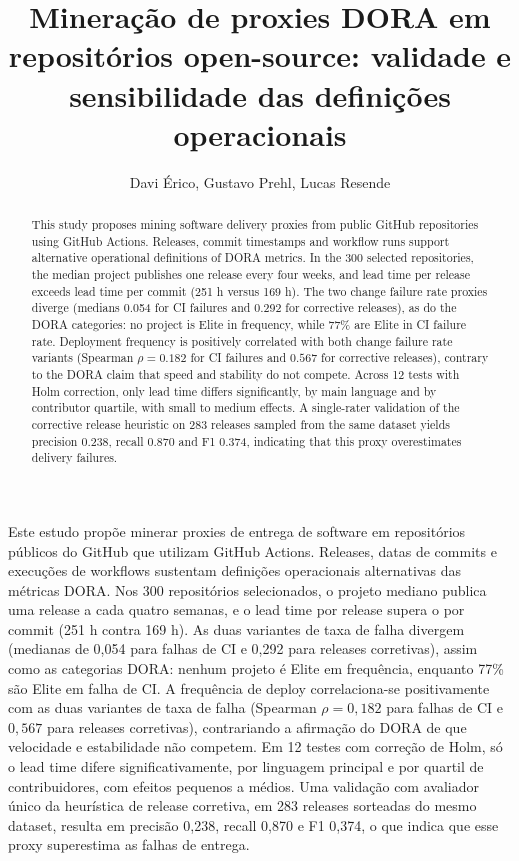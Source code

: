 \documentclass[12pt]{article}
\title{Mineração de proxies DORA em repositórios open-source:
validade e sensibilidade das definições operacionais}
\author{Davi Érico\inst{1}, Gustavo Prehl\inst{1}, Lucas Resende\inst{1}}
\begin{document}
\maketitle

\begin{abstract}
This study proposes mining software delivery proxies from public GitHub
repositories using GitHub Actions. Releases, commit timestamps and workflow
runs support alternative operational definitions of DORA metrics. In the 300
selected repositories, the median project publishes one release every four
weeks, and lead time per release exceeds lead time per
commit (251 h versus 169 h). The two change failure rate proxies diverge
(medians 0.054 for CI failures and 0.292 for corrective releases), as do the
DORA categories: no project is Elite in frequency, while 77\% are Elite in CI
failure rate. Deployment frequency is positively correlated with both change
failure rate variants (Spearman $\rho = 0.182$ for CI failures and $0.567$ for
corrective releases), contrary to the DORA claim that speed and stability do
not compete. Across 12 tests with Holm correction, only lead time differs
significantly, by main language and by contributor quartile, with small to
medium effects. A single-rater validation of the corrective release heuristic
on 283 releases sampled from the same dataset yields precision 0.238, recall
0.870 and F1 0.374, indicating that this proxy overestimates delivery failures.
\end{abstract}

\begin{resumo}
Este estudo propõe minerar proxies de entrega de software em repositórios
públicos do GitHub que utilizam GitHub Actions. Releases, datas de commits e
execuções de workflows sustentam definições operacionais alternativas das
métricas DORA. Nos 300 repositórios selecionados, o
projeto mediano publica uma release a cada quatro semanas, e o lead time por
release supera o por commit (251 h contra 169 h). As duas variantes de taxa de
falha divergem (medianas de 0,054 para falhas de CI e 0,292 para releases
corretivas), assim como as categorias DORA: nenhum projeto é Elite em
frequência, enquanto 77\% são Elite em falha de CI. A frequência de deploy correlaciona-se
positivamente com as duas variantes de taxa de falha (Spearman $\rho = 0{,}182$
para falhas de CI e $0{,}567$ para releases corretivas), contrariando a
afirmação do DORA de que velocidade e estabilidade não competem. Em 12 testes
com correção de Holm, só o lead time difere significativamente, por linguagem
principal e por quartil de contribuidores, com efeitos pequenos a médios. Uma
validação com avaliador único da heurística de
release corretiva, em 283 releases sorteadas do mesmo dataset, resulta em
precisão 0,238, recall 0,870 e F1 0,374, o que indica que esse proxy
superestima as falhas de entrega.
\end{resumo}
\end{document}
